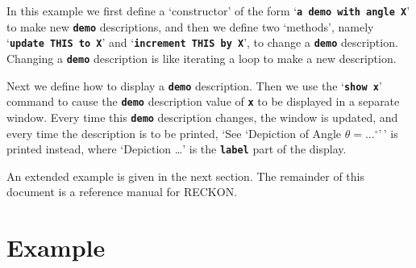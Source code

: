 \documentclass[12pt]{article}
\newcommand{\TT}[1]{{\tt \bfseries #1}}
\newlength{\figurewidth}
\newenvironment{boxedfigure}[1][!btp]%
	{\begin{figure*}[#1]
	 \begin{lrbox}{\figurebox}
	 \begin{minipage}{\figurewidth}

	 \vspace*{1ex}}%
	{
	 \vspace*{1ex}

	 \end{minipage}
	 \end{lrbox}
	 \begin{center}
	 \fbox{\hspace*{0.1in}\usebox{\figurebox}\hspace*{0.1in}}
	 \end{center}
	 \end{figure*}}
\begin{document}
In this example we first define a `constructor'
of the form `\TT{a demo with angle X}' to make new \TT{demo} descriptions,
and then we define two `methods', namely `\TT{update THIS to X}' and
`\TT{in\-cre\-ment THIS by X}', to change a \TT{demo} description.  Changing
a \TT{demo} description is like iterating a loop to make a new description.

Next we define how to display a \TT{demo} description.  Then we use the
`\TT{show x}' command
to cause the \TT{demo} description value of \TT{x}
to be displayed in a separate window.
Every time this \TT{demo} description
changes, the window is updated, and every time the description
is to be printed,
`See `Depiction of Angle $\theta=\ldots^\circ$'\,'
is printed instead, where `Depiction \ldots' is the \TT{label} part of
the display.

An extended example is given in the next section.
The remainder of this document is a reference manual for RECKON.

\section{Example}


\end{document}
